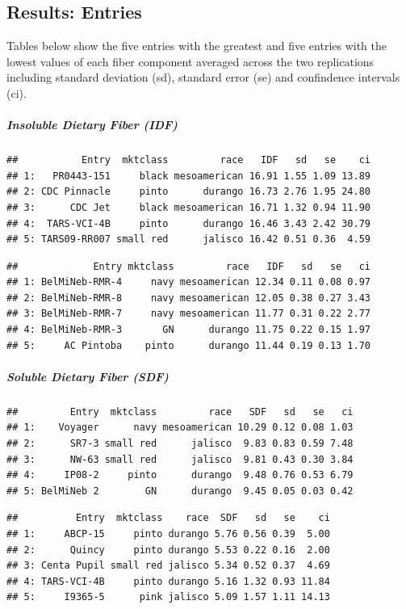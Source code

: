 \documentclass[11pt,]{article}
\begin{document}
\subsection{Results: Entries}\label{results-entries}

Tables below show the five entries with the greatest and five entries
with the lowest values of each fiber component averaged across the two
replications including standard deviation (sd), standard error (se) and
confindence intervals (ci).

\subparagraph{Insoluble Dietary Fiber
(IDF)}\label{insoluble-dietary-fiber-idf}

\begin{verbatim}
##           Entry  mktclass         race   IDF   sd   se    ci
## 1:   PR0443-151     black mesoamerican 16.91 1.55 1.09 13.89
## 2: CDC Pinnacle     pinto      durango 16.73 2.76 1.95 24.80
## 3:      CDC Jet     black mesoamerican 16.71 1.32 0.94 11.90
## 4:  TARS-VCI-4B     pinto      durango 16.46 3.43 2.42 30.79
## 5: TARS09-RR007 small red      jalisco 16.42 0.51 0.36  4.59
\end{verbatim}

\begin{verbatim}
##             Entry mktclass         race   IDF   sd   se   ci
## 1: BelMiNeb-RMR-4     navy mesoamerican 12.34 0.11 0.08 0.97
## 2: BelMiNeb-RMR-8     navy mesoamerican 12.05 0.38 0.27 3.43
## 3: BelMiNeb-RMR-7     navy mesoamerican 11.77 0.31 0.22 2.77
## 4: BelMiNeb-RMR-3       GN      durango 11.75 0.22 0.15 1.97
## 5:     AC Pintoba    pinto      durango 11.44 0.19 0.13 1.70
\end{verbatim}

\subparagraph{Soluble Dietary Fiber
(SDF)}\label{soluble-dietary-fiber-sdf}

\begin{verbatim}
##         Entry  mktclass         race   SDF   sd   se   ci
## 1:    Voyager      navy mesoamerican 10.29 0.12 0.08 1.03
## 2:      SR7-3 small red      jalisco  9.83 0.83 0.59 7.48
## 3:      NW-63 small red      jalisco  9.81 0.43 0.30 3.84
## 4:     IP08-2     pinto      durango  9.48 0.76 0.53 6.79
## 5: BelMiNeb 2        GN      durango  9.45 0.05 0.03 0.42
\end{verbatim}

\begin{verbatim}
##          Entry  mktclass    race  SDF   sd   se    ci
## 1:     ABCP-15     pinto durango 5.76 0.56 0.39  5.00
## 2:      Quincy     pinto durango 5.53 0.22 0.16  2.00
## 3: Centa Pupil small red jalisco 5.34 0.52 0.37  4.69
## 4: TARS-VCI-4B     pinto durango 5.16 1.32 0.93 11.84
## 5:     I9365-5      pink jalisco 5.09 1.57 1.11 14.13
\end{verbatim}
\end{document}
